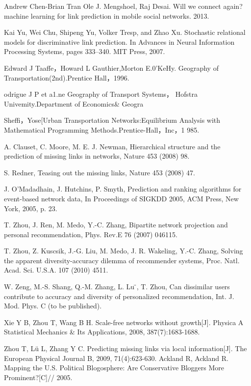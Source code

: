 \documentclass[onecolumn,preprintnumbers,amsmath,amssymb]{revtex4}
\begin{document}
\begin{thebibliography}{00}
Andrew Chen-Brian Tran Ole J. Mengshoel, Raj Desai. Will we connect again? machine learning for link prediction in mobile social networks. 2013.

Kai Yu, Wei Chu, Shipeng Yu, Volker Tresp, and Zhao Xu. Stochastic
relational models for discriminative link prediction. In Advances in Neural Information Processing Systems, pages 333–340. MIT Press, 2007.

Edward J Taaffe，Howard L Gauthier,Morton E.0’KeHy.
Geography of Transportation(2nd).Prentice Hall，1996.

odrigue J P et a1.ne Geography of Transport Systems，
Hofstra Univemity.Department of Economics\& Geogra

Sheffi，Yose[Urban Transportation Networks:Equilibrium Analysis with Mathematical Programming Methods.Prentice-Hall，Inc，1 985.

A. Clauset, C. Moore, M. E. J. Newman, Hierarchical structure and the prediction of missing links in networks, Nature 453 (2008) 98.

S. Redner, Teasing out the missing links, Nature 453 (2008) 47.

J. O’Madadhain, J. Hutchins, P. Smyth, Prediction and ranking algorithms for event-based network data, In Proceedings of SIGKDD 2005, ACM Press, New York, 2005, p. 23.

T. Zhou, J. Ren, M. Medo, Y.-C. Zhang, Bipartite network projection and personal recommendation, Phys. Rev.E 76 (2007) 046115.

T. Zhou, Z. Kuscsik, J.-G. Liu, M. Medo, J. R. Wakeling, Y.-C. Zhang, Solving the apparent diversity-accuracy dilemma of recommender systems, Proc. Natl. Acad. Sci. U.S.A. 107 (2010) 4511.

W. Zeng, M.-S. Shang, Q.-M. Zhang, L. Lu ̈, T. Zhou, Can dissimilar users contribute to accuracy and diversity of personalized recommendation, Int. J. Mod. Phys. C (to be published).



Xie Y B, Zhou T, Wang B H. Scale-free networks without growth[J]. Physica A Statistical Mechanics \& Its Applications, 2008, 387(7):1683-1688.

Zhou T, Lü L, Zhang Y C. Predicting missing links via local information[J]. The European Physical Journal B, 2009, 71(4):623-630.
Ackland R, Ackland R. Mapping the U.S. Political Blogosphere: Are Conservative Bloggers More Prominent?[C]// 2005.


\end{thebibliography}
\end{document}
